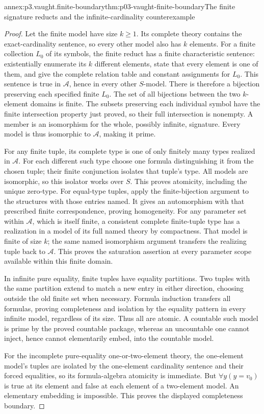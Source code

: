\begin{annexitem}{annex:p3.vaught.finite-boundary}{thm:p03-vaught-finite-boundary}{The finite signature reducts and the infinite-cardinality counterexample}
\begin{proof}
Let the finite model have size \(k\geq1\).
Its complete theory contains the exact-cardinality sentence,
so every other model also has \(k\) elements.
For a finite collection \(L_0\) of its symbols, the finite reduct
has a finite characteristic sentence: existentially enumerate its
\(k\) different elements, state that every element is one of them,
and give the complete relation table and constant assignments
for \(L_0\).
This sentence is true in \(\mathcal A\), hence in every other
\(S\)-model. There is therefore a bijection preserving each
specified finite \(L_0\).
The set of all bijections between the two \(k\)-element domains
is finite. The subsets preserving each individual symbol have
the finite intersection property just proved, so their full
intersection is nonempty. A member is an isomorphism for the
whole, possibly infinite, signature.
Every model is thus isomorphic to \(\mathcal A\), making it prime.

For any finite tuple, its complete type is one of only finitely
many types realized in \(\mathcal A\). For each different such
type choose one formula distinguishing it from the chosen tuple;
their finite conjunction isolates that tuple's type.
All models are isomorphic, so this isolator works over \(S\).
This proves atomicity, including the unique zero-type.
For equal-type tuples, apply the finite-bijection argument to
the structures with those entries named. It gives an automorphism
with that prescribed finite correspondence, proving homogeneity.
For any parameter set within \(\mathcal A\), which is itself finite,
a consistent complete finite-tuple type has a realization in a
model of its full named theory by compactness.
That model is finite of size \(k\); the same named isomorphism
argument transfers the realizing tuple back to \(\mathcal A\).
This proves the saturation assertion at every parameter scope
available within this finite domain.

In infinite pure equality, finite tuples have equality partitions.
Two tuples with the same partition extend to match a new entry
in either direction, choosing outside the old finite set when
necessary. Formula induction transfers all formulas, proving
completeness and isolation by the equality pattern in every
infinite model, regardless of its size.
Thus all are atomic. A countable such model is prime by the
proved countable package, whereas an uncountable one cannot
inject, hence cannot elementarily embed, into the countable model.

For the incomplete pure-equality one-or-two-element theory, the one-element
model's tuples are isolated by the one-element cardinality
sentence and their forced equalities, so its formula-algebra
atomicity is immediate. But \(\forall y(y=v_0)\) is true at its
element and false at each element of a two-element model.
An elementary embedding is impossible.
This proves the displayed completeness boundary.
\end{proof}
\end{annexitem}

